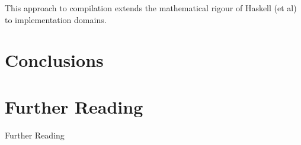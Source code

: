 \documentclass[10pt]{beamer}
\theoremstyle{definition}
\theoremstyle{remark}
\numberwithin{equation}{section}
\begin{document}
\begin{frame}[fragile]{}
  This approach to compilation extends the mathematical rigour of Haskell (et al) to implementation domains.
\end{frame}

\section{Conclusions} %

\section{Further Reading}

\begin{frame}[fragile]{Further Reading}

  \nocite{elkins_calculating_2009}
  \nocite{diel:blog}
  \nocite{milewski2014}

  
  

\end{frame}
\end{document}
